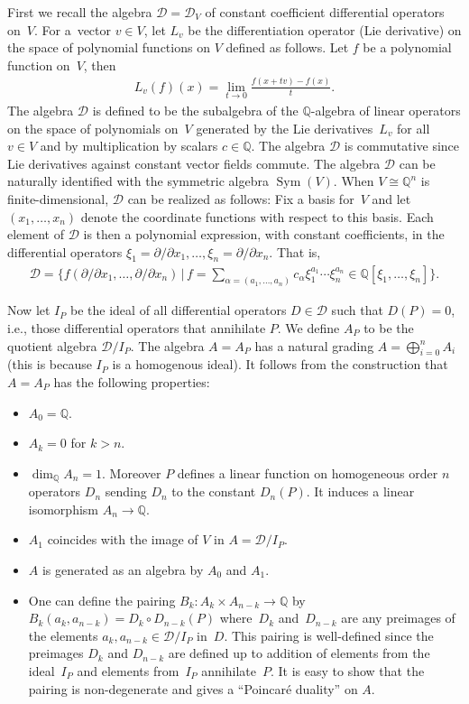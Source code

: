 \documentclass[pdftex]{sigma}
\def \Q{\mathbb{Q}}
\def \D{\mathcal{D}}
\def \Sym{\operatorname{Sym}}
\numberwithin{equation}{section}
\theoremstyle{definition}
\begin{document}
First we recall the algebra $\D = \D_V$ of constant coefficient differential operators on~$V$. For a~vector $v \in V$, let $L_v$ be the differentiation operator (Lie derivative) on the space of polynomial functions on $V$ defined as follows. Let $f$ be a polynomial function on~$V$, then
\begin{gather*} L_v(f)(x) = \lim_{t \to 0} \frac{f(x+tv) - f(x)}{t}.\end{gather*}
The algebra $\D$ is defined to be the subalgebra of the $\Q$-algebra of linear operators on the space of polynomials on~$V$ generated by the Lie derivatives~$L_v$ for all $v \in V$ and by multiplication by scalars $c \in \Q$. The algebra $\D$ is commutative since Lie derivatives against constant vector fields commute. The algebra $\D$ can be naturally identified with the symmetric algebra $\Sym(V)$. When $V \cong \Q^n$ is finite-dimensional, $\D$ can be realized as follows: Fix a basis for~$V$ and let $(x_1, \ldots, x_n)$ denote the coordinate functions with respect to this basis. Each element of $\D$ is then a polynomial expression, with constant coefficients, in the differential operators $\xi_1=\partial/\partial x_1, \ldots,\xi_n= \partial/\partial x_n$. That is,
\begin{gather*} \D =\bigg\{ f(\partial/\partial x_1, \ldots, \partial/\partial x_n) \,|\, f = \sum_{\alpha = (a_1, \ldots, a_n)} c_\alpha \xi_1^{a_1} \cdots \xi_n^{a_n} \in \Q[\xi_1, \ldots, \xi_n]\bigg\}.
\end{gather*}

Now let $I_P$ be the ideal of all differential operators $D \in \D$ such that $D (P) = 0$, i.e., those differential operators that annihilate $P$. We define $A_P$ to be the quotient algebra $\D / I_P$.
The algebra $A = A_P$ has a natural grading $A= \bigoplus_{i=0}^n A_i$ (this is because $I_P$ is a homogenous ideal). It follows from the construction that $A = A_P$ has the following properties:
\begin{itemize}\itemsep=0pt
\item $A_0=\Q$.
\item $A_k=0$ for $k>n$.
\item $\dim _{\Q}A_n=1$. Moreover $P$ defines a linear function on homogeneous order $n$ operators $D_n$ sending $D_n$ to the constant $D_n(P)$. It induces a linear isomorphism $A_n \to \Q$.
\item $A_1$ coincides with the image of $V$ in $A=\D / I_P$.
\item $A$ is generated as an algebra by $A_0$ and $A_1$.
\item One can define the pairing $B_k\colon A_k\times A_{n-k}\rightarrow \Q$ by $B_k(a_k, a_{n-k}) = D_k \circ D_{n-k}(P)$ where~$D_k$ and~$D_{n-k}$ are any preimages of the elements $a_k,a_{n-k}\in \D/I_P$ in~$D$. This pairing is well-defined since the preimages $D_k$ and $D_{n-k}$ are defined up to addition of elements from the ideal~$I_P$ and elements from~$I_P$ annihilate~$P$. It is easy to show that the pairing is non-degenerate and gives a ``Poincar\'e duality'' on $A$.
\end{itemize}
\end{document}
